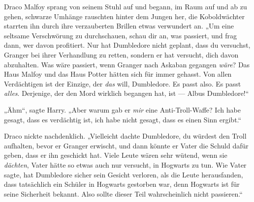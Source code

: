Draco Malfoy sprang von seinem Stuhl auf und begann, im Raum auf und ab zu gehen, schwarze Umhänge rauschten hinter dem Jungen her, die Koboldwächter starrten ihn durch ihre verzauberten Brillen etwas verwundert an.
„Um eine seltsame Verschwörung zu durchschauen, schau dir an, was passiert, und frag dann, wer davon profitiert. Nur hat Dumbledore nicht geplant, dass du versuchst, Granger bei ihrer Verhandlung zu retten, sondern er hat versucht, dich davon abzuhalten. Was wäre passiert, wenn Granger nach Askaban gegangen \emph{wäre}? Das Haus Malfoy und das Haus Potter hätten sich für immer gehasst. Von allen Verdächtigen ist der Einzige, der \emph{das} will, Dumbledore. Es passt also. Es passt \emph{alles}. Derjenige, der den Mord wirklich begangen hat, ist — Albus Dumbledore!“

„Ähm“, sagte Harry.
„Aber warum gab er \emph{mir} eine Anti-Troll-Waffe? Ich habe gesagt, dass es verdächtig ist, ich habe nicht gesagt, dass es einen Sinn ergibt.“

Draco nickte nachdenklich.
„Vielleicht dachte Dumbledore, du würdest den Troll aufhalten, bevor er Granger erwischt, und dann könnte er Vater die Schuld dafür geben, dass er ihn geschickt hat. Viele Leute wären sehr wütend, wenn sie \emph{dächten}, Vater hätte so etwas auch nur versucht, in Hogwarts zu tun. Wie Vater sagte, hat Dumbledore sicher sein Gesicht verloren, als die Leute herausfanden, dass tatsächlich ein Schüler in Hogwarts gestorben war, denn Hogwarts ist für seine Sicherheit bekannt. Also sollte dieser Teil wahrscheinlich nicht passieren.“

